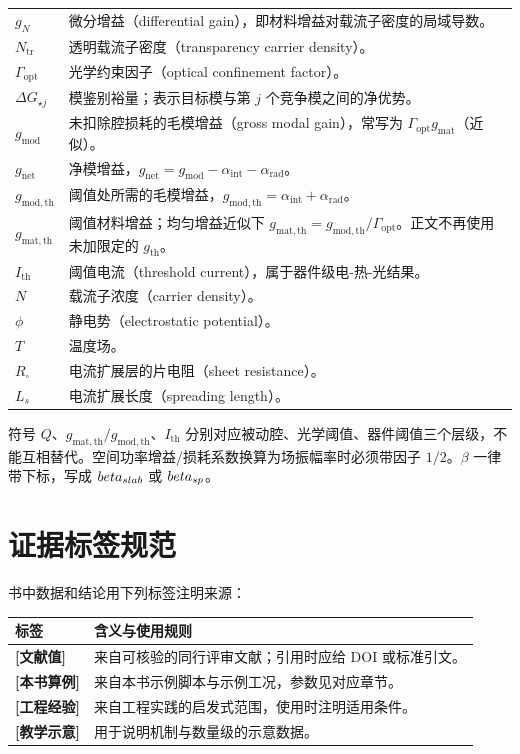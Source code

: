 \begin{longtable}{p{}p{}}
$g_N$ & 微分增益（differential gain），即材料增益对载流子密度的局域导数。 \\
$N_\mathrm{tr}$ & 透明载流子密度（transparency carrier density）。 \\
$\Gamma_\mathrm{opt}$ & 光学约束因子（optical confinement factor）。 \\
$\Delta G_{\star j}$ & 模鉴别裕量；表示目标模与第 $j$ 个竞争模之间的净优势。 \\
$g_\mathrm{mod}$ & 未扣除腔损耗的毛模增益（gross modal gain），常写为 $\Gamma_\mathrm{opt}g_\mathrm{mat}$（近似）。 \\
$g_\mathrm{net}$ & 净模增益，$g_\mathrm{net}=g_\mathrm{mod}-\alpha_\mathrm{int}-\alpha_\mathrm{rad}$。 \\
$g_\mathrm{mod,th}$ & 阈值处所需的毛模增益，$g_\mathrm{mod,th}=\alpha_\mathrm{int}+\alpha_\mathrm{rad}$。 \\
$g_\mathrm{mat,th}$ & 阈值材料增益；均匀增益近似下 $g_\mathrm{mat,th}=g_\mathrm{mod,th}/\Gamma_\mathrm{opt}$。正文不再使用未加限定的 $g_\mathrm{th}$。 \\
$I_\mathrm{th}$ & 阈值电流（threshold current），属于器件级电-热-光结果。 \\
$N$ & 载流子浓度（carrier density）。 \\
$\phi$ & 静电势（electrostatic potential）。 \\
$T$ & 温度场。 \\
$R_\square$ & 电流扩展层的片电阻（sheet resistance）。 \\
$L_s$ & 电流扩展长度（spreading length）。 \\
\bottomrule
\end{longtable}

\begin{PitfallBox}
符号 $Q$、$g_\mathrm{mat,th}/g_\mathrm{mod,th}$、$I_\mathrm{th}$ 分别对应被动腔、光学阈值、器件阈值三个层级，不能互相替代。空间功率增益/损耗系数换算为场振幅率时必须带因子 $1/2$。$\beta$ 一律带下标，写成 $beta_{slab}$ 或 $beta_{sp}$。
\end{PitfallBox}

\chapter*{证据标签规范}

书中数据和结论用下列标签注明来源：

\begin{longtable}{p{}p{}}
\toprule
标签 & 含义与使用规则 \\
\midrule
\endhead
\textbf{[文献值]} & 来自可核验的同行评审文献；引用时应给 DOI 或标准引文。 \\
\textbf{[本书算例]} & 来自本书示例脚本与示例工况，参数见对应章节。 \\
\textbf{[工程经验]} & 来自工程实践的启发式范围，使用时注明适用条件。 \\
\textbf{[教学示意]} & 用于说明机制与数量级的示意数据。 \\
\bottomrule
\end{longtable}

